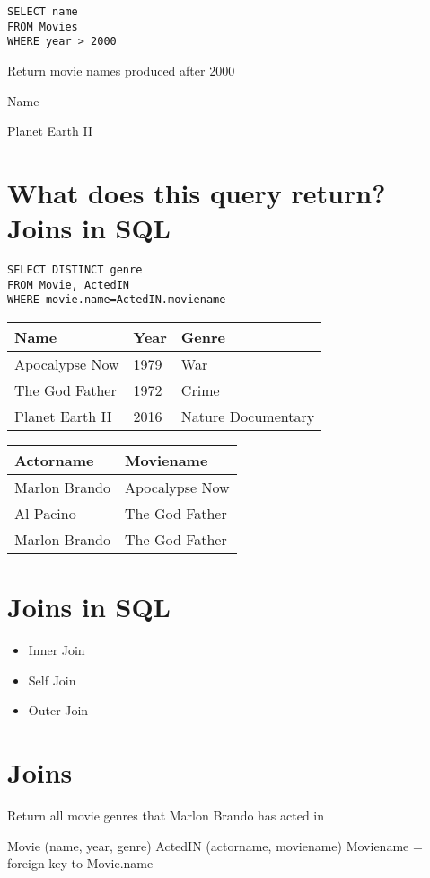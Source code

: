\documentclass{article}
\begin{document}
\begin{verbatim}
SELECT name
FROM Movies
WHERE year > 2000
\end{verbatim}
Return movie names produced after 2000

Name

Planet Earth II

\section*{What does this query return?  Joins in SQL}
\begin{verbatim}
SELECT DISTINCT genre
FROM Movie, ActedIN
WHERE movie.name=ActedIN.moviename
\end{verbatim}
\begin{tabular}{lll}
\hline
Name & Year & Genre \\
\hline
Apocalypse Now & 1979 & War \\
The God Father & 1972 & Crime \\
Planet Earth II & 2016 & Nature Documentary \\
\hline
\end{tabular}

\begin{tabular}{ll}
\hline
Actorname & Moviename \\
\hline
Marlon Brando & Apocalypse Now \\
Al Pacino & The God Father \\
Marlon Brando & The God Father \\
\hline
\end{tabular}

\newpage

\section*{Joins in SQL}
\begin{itemize}
    \item Inner Join
    \item Self Join
    \item Outer Join
\end{itemize}

\section*{Joins}
Return all movie genres that Marlon Brando has acted in

Movie (name, year, genre)
ActedIN (actorname, moviename)
Moviename = foreign key to Movie.name
\end{document}
